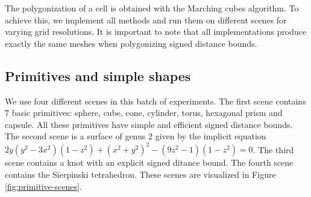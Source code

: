 \documentclass[11pt,twocolumn]{article}
\begin{document}
		The polygonization of a cell is obtained with the Marching cubes algorithm.
		To achieve this, we implement all methods and run them on different scenes for varying grid resolutions.
		It is important to note that all implementations produce exactly the same meshes when polygonizing signed distance bounds.

		\subsection{Primitives and simple shapes}\label{sec:experiments-primitive}
		We use four different scenes in this batch of experiments.
		The first scene contains $7$ basic primitives:
		sphere, cube, cone, cylinder, torus, hexagonal prism and capsule.
		All these primitives have simple and efficient signed distance bounds.
		The second scene is a surface of genus $2$ given by the implicit equation
		$2y(y^2-3x^2)(1-z^2) + (x^2 + y^2)^2 - (9z^2 - 1)(1-z^2)=0$.
		The third scene contains a knot with an explicit signed ditance bound.
		The fourth scene contains the Sierpinski tetrahedron.
		These scenes are visualized in Figure \ref{fig:primitive-scenes}.
\end{document}
